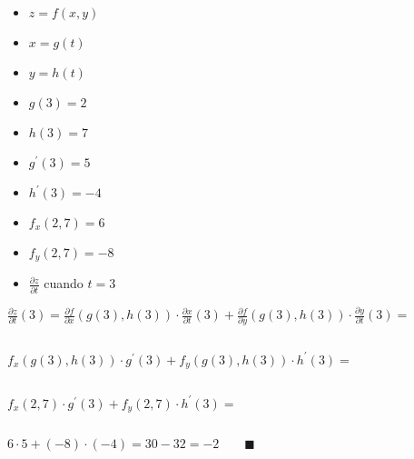 \documentclass[../practica_04.tex]{subfiles}
\begin{document}
    \begin{itemize}
        \item $ z = f(x,y) $
        \item $ x = g(t) $
        \item $ y = h(t) $
        \item $ g(3) = 2 $
        \item $ h(3) = 7 $
        \item $ g^\prime(3) = 5 $
        \item $ h^\prime(3) = -4 $
        \item $ f_x(2,7) = 6$
        \item $ f_y(2,7) = -8$
        \item $ \frac{\partial z}{\partial t}$ cuando $ t = 3 $
    \end{itemize}

    $\frac{\partial z}{\partial t} (3) = 
            \frac{\partial f}{\partial x}(g(3),h(3)) \cdot \frac{\partial x}{\partial t}(3) +
            \frac{\partial f}{\partial y}(g(3),h(3)) \cdot \frac{\partial y}{\partial t}(3) = $

    $ $

    $ f_x(g(3),h(3)) \cdot g^\prime(3) + f_y(g(3),h(3)) \cdot h^\prime(3) = $

    $ $

    $ f_x(2,7) \cdot g^\prime(3) + f_y(2,7) \cdot h^\prime(3) = $

    $ $

    $ 6 \cdot 5 + (-8) \cdot (-4) = 30 - 32 = -2 \qquad \blacksquare$
\end{document}
